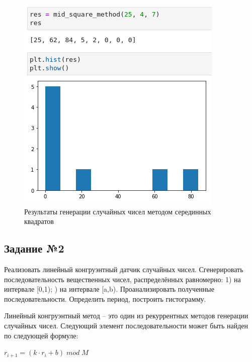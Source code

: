 \documentclass[14pt,fleqn]{extarticle}
\begin{document}
    \begin{figure}[h]
        \centering \includegraphics[scale=0.8]{mid_square_method_result}
        \caption{Результаты генерации случайных чисел методом серединных квадратов}
        \label{fig:mid_square_method_result}
    \end{figure}
    
    \subsection*{Задание №2}
    Реализовать линейный конгруэнтный датчик случайных чисел. Сгенерировать последовательность вещественных чисел, распределённых равномерно: 1) на интервале [0,1); ) на интервале [a,b). Проанализировать полученные последовательности. Определить период, построить гистограмму.\\
    \newline

    Линейный конгруэнтный метод -- это один из рекуррентных методов генерации случайных чисел. Следующий элемент последовательности может быть найден по следующей формуле:
    \begin{center}
        $ r_{i+1} = (k \cdot r_i + b) \; mod \; M$
    \end{center}
    
\end{document}
